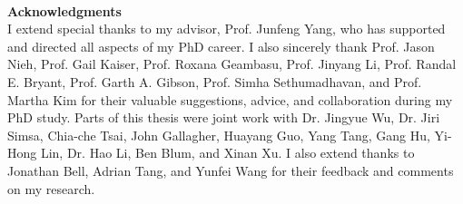 ~\\[1in] %
\textbf{\Huge Acknowledgments}\\

\noindent 
I extend special thanks to my advisor, Prof. Junfeng Yang, who has supported and directed all aspects of my PhD career. I also sincerely thank Prof. Jason Nieh, Prof. Gail Kaiser, Prof. Roxana Geambasu, Prof. Jinyang Li, Prof. Randal E. Bryant, Prof. Garth A. Gibson, Prof. Simha Sethumadhavan, and Prof. Martha Kim for their valuable suggestions, advice, and collaboration during my PhD study. Parts of this thesis were joint work with Dr. Jingyue Wu, Dr. Jiri Simsa, Chia-che Tsai, John Gallagher, Huayang Guo, Yang Tang, Gang Hu, Yi-Hong Lin, Dr. Hao Li,  Ben Blum, and Xinan Xu. I also extend thanks to Jonathan Bell, Adrian Tang, and Yunfei Wang for their feedback and comments on my research.